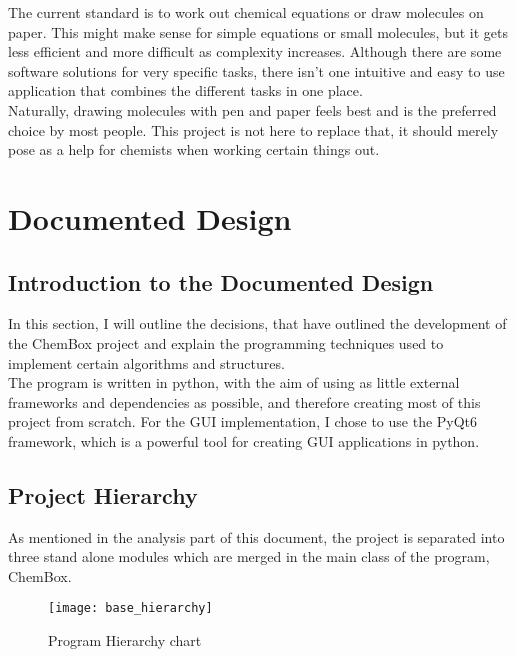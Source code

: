 \documentclass[a4paper,12pt]{article}
\begin{document}
The current standard is to work out chemical equations or draw molecules on paper. This might make sense for simple equations or small molecules, but it gets less efficient and more difficult as complexity increases. Although there are some software solutions for very specific tasks, there isn't one intuitive and easy to use application that combines the different tasks in one place.\\
\linebreak
Naturally, drawing molecules with pen and paper feels best and is the preferred choice by most people. This project is not here to replace that, it should merely pose as a help for chemists when working certain things out.

\newpage

\section{Documented Design}

\subsection{Introduction to the Documented Design}

In this section, I will outline the decisions, that have outlined the development of the ChemBox project and explain the programming techniques used to implement certain algorithms and structures.\\
The program is written in python, with the aim of using as little external frameworks and dependencies as possible, and therefore creating most of this project from scratch. For the GUI implementation, I chose to use the PyQt6 framework, which is a powerful tool for creating GUI applications in python.\\

\subsection{Project Hierarchy}

As mentioned in the analysis part of this document, the project is separated into three stand alone modules which are merged in the main class of the program, ChemBox.

\begin{figure} [h]
	\centering
	\texttt{[image: base\_hierarchy]}
	\caption{Program Hierarchy chart}
	\label{fig:tabs_mockup}
\end{figure}
\end{document}
